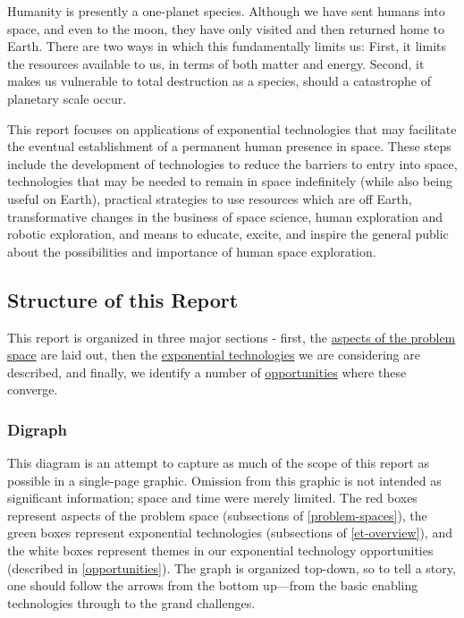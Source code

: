 \documentclass[letter,11pt]{article}
\begin{document}
Humanity is presently a one-planet species. Although we have sent
humans into space, and even to the moon, they have only visited and
then returned home to Earth. There are two ways in which this
fundamentally limits us: First, it limits the resources available to
us, in terms of both matter and energy. Second, it makes us vulnerable
to total destruction as a species, should a catastrophe of planetary
scale occur.

This report focuses on applications of exponential technologies that may
facilitate the eventual establishment of a permanent human presence in space.
These steps include the development of technologies to reduce the barriers to
entry into space, technologies that may be needed to remain in space
indefinitely (while also being useful on Earth), practical strategies to use
resources which are off Earth, transformative changes in the business of space
science, human exploration and robotic exploration, and means to educate,
excite, and inspire the general public about the possibilities and importance
of human space exploration.

\subsection{Structure of this Report}

This report is organized in three major sections - first, the
\hyperref[problem-spaces]{aspects of the problem space} are laid out, then the
\hyperref[et-overview]{exponential technologies} we are considering are
described, and finally, we identify a number of
\hyperref[opportunities]{opportunities} where these converge.

\subsubsection{Digraph}

This diagram is an attempt to capture as much of the scope of this report as
possible in a single-page graphic. Omission from this graphic is not intended
as significant information; space and time were merely limited. The red boxes
represent aspects of the problem space (subsections of
\autoref{problem-spaces}), the green boxes represent exponential technologies
(subsections of \autoref{et-overview}), and the white boxes represent themes in
our exponential technology opportunities (described in
\autoref{opportunities}). The graph is organized top-down, so to tell a story,
one should follow the arrows from the bottom up---from the basic enabling
technologies through to the grand challenges.
\end{document}
